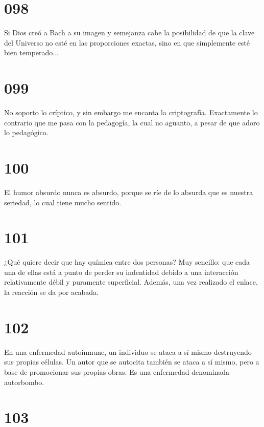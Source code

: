 \documentclass[a4paper,11pt,openright,twocolumn]{book}
\begin{document}
\section*{098}


Si Dios creó a Bach a su imagen y semejanza cabe la posibilidad de que la clave del Universo no esté en las proporciones exactas,
sino en que simplemente esté bien temperado...

\section*{099}

No soporto lo críptico, y sin embargo me encanta la criptografía. Exactamente lo contrario que me pasa
con la pedagogía, la cual no aguanto, a pesar de que adoro lo pedagógico. 

\section*{100}

El humor absurdo nunca es absurdo, porque se ríe de lo absurda que es nuestra seriedad, lo cual tiene
mucho sentido. 

\section*{101}

¿Qué quiere decir que hay química entre dos personas? Muy sencillo: que cada una de ellas está a punto de
perder su indentidad debido a una interacción relativamente débil y puramente superficial. Además, una vez
realizado el enlace, la reacción se da por acabada. 

\section*{102}

En una enfermedad autoinmune, un individuo se ataca a sí mismo destruyendo sus propias células. Un autor
que se autocita también se ataca a sí mismo, pero a base de promocionar sus propias obras. Es una enfermedad
denominada autorbombo. 

\section*{103}
\end{document}
